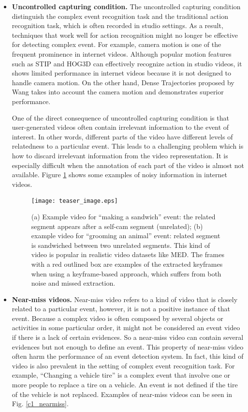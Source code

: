 \begin{itemize}
	\item{\textbf{Uncontrolled capturing condition.}} The uncontrolled capturing condition distinguish the complex event recognition task and the traditional action recognition task, which is often recorded in studio settings. As a result, techniques that work well for action recognition might no longer be effective for detecting complex event. For example, camera motion is one of the frequent prominence in internet videos. Although popular motion features  such as  STIP \cite{Laptev03space-timeinterest} and  HOG3D \cite{Klaser08BMVC} can effectively recognize action in studio videos, it shows limited performance in internet videos because it is not designed to handle camera motion. On the other hand, Dense Trajectories proposed by Wang takes into account the camera motion and demonstrates superior performance.
	 
	One of the direct consequence of uncontrolled capturing condition is that user-generated videos often contain irrelevant information to the event of interest. In other words, different parts of the video have different levels of relatedness to a particular event. This leads to a challenging problem which is how to discard irrelevant information from the video representation. It is especially difficult when the annotation of each part of the video is almost not available. Figure \ref{c1_uncontrolled} shows some examples of noisy information in internet videos.
	
	\begin{figure}
		\centering
		\texttt{[image: teaser\_image.eps]}
		\caption{(a) Example video for ``making a sandwich'' event: the related segment appears after a self-cam segment (unrelated); (b) example video for ``grooming an animal'' event: related segment is sandwiched between two unrelated segments. This kind of video is popular in realistic video datasets like MED. The frames with a red outlined box are examples of the extracted keyframes when using a keyframe-based approach, which suffers from both noise and missed extraction.}
		\label{c1_uncontrolled}
	\end{figure}
	 
	\item{\textbf{Near-miss videos.}} Near-miss video refers to a kind of video that is closely related to a particular event, however, it is not a positive instance of that event. Because a complex video is often composed by several objects or activities in some particular order, it might not be considered an event video if there is a lack of certain evidences. So a near-miss video can contain several evidences but not enough to define an event. This property of near-miss video often harm the performance of an event detection system. In fact, this kind of video is also prevalent in the setting of complex event recognition task. For example, ``Changing a vehicle tire'' is a complex event that involve one or more people to replace a tire on a vehicle. An event is not defined if the tire of the vehicle is not replaced. Examples of near-miss videos can be seen in Fig. \ref{c1_nearmiss}.
	

\end{itemize}

